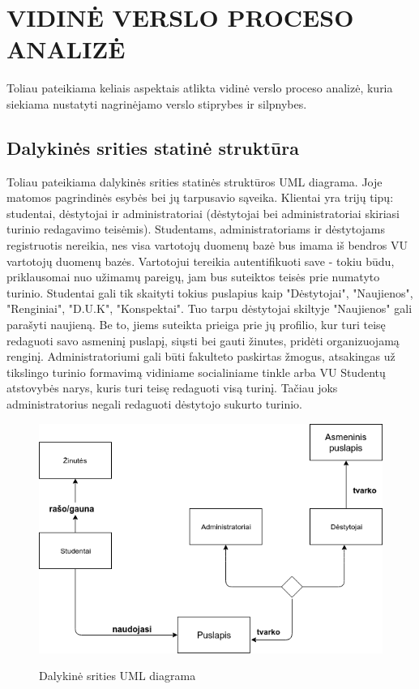 \documentclass{VUMIFPSkursinis}
\begin{document}
\section{VIDINĖ VERSLO PROCESO ANALIZĖ}
Toliau pateikiama keliais aspektais atlikta vidinė verslo proceso analizė, kuria siekiama nustatyti nagrinėjamo verslo stiprybes ir silpnybes.

\subsection{Dalykinės srities statinė struktūra}
 Toliau pateikiama dalykinės srities statinės struktūros UML diagrama. Joje matomos pagrindinės esybės bei jų tarpusavio sąveika. Klientai yra trijų tipų: studentai, dėstytojai ir administratoriai (dėstytojai bei administratoriai skiriasi turinio redagavimo teisėmis). Studentams, administratoriams ir dėstytojams registruotis nereikia, nes visa vartotojų duomenų bazė bus imama iš bendros VU vartotojų duomenų bazės. Vartotojui tereikia autentifikuoti save - tokiu būdu, priklausomai nuo užimamų pareigų, jam bus suteiktos teisės prie numatyto turinio. Studentai gali tik skaityti tokius puslapius kaip "Dėstytojai", "Naujienos", "Renginiai", "D.U.K", "Konspektai". Tuo tarpu dėstytojai skiltyje "Naujienos" gali parašyti naujieną. Be to, jiems suteikta prieiga prie jų profilio, kur turi teisę redaguoti savo asmeninį puslapį, siųsti bei gauti žinutes, pridėti organizuojamą renginį. Administratoriumi gali būti fakulteto paskirtas žmogus, atsakingas už tikslingo turinio formavimą vidiniame socialiniame tinkle arba VU Studentų atstovybės narys, kuris turi teisę redaguoti visą turinį. Tačiau joks administratorius negali redaguoti dėstytojo sukurto turinio.\\

\begin{figure}[H]
\centering
\includegraphics[width=\linewidth]{img/dalykine.png}
\label{fig:dalykine}
\caption{Dalykinė srities UML diagrama}
\end{figure}
\end{document}
